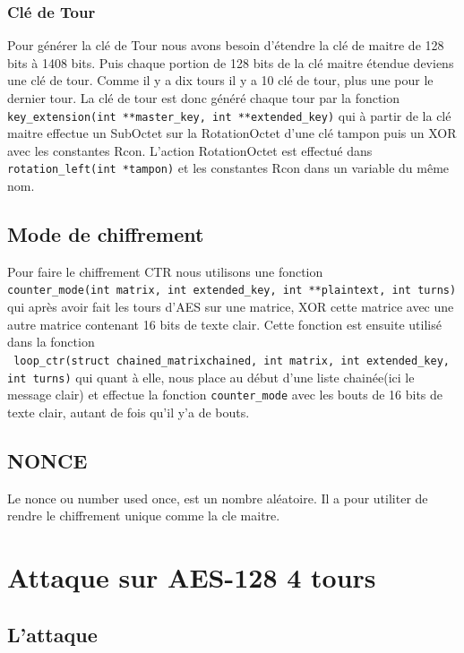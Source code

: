 \documentclass[10pt, a4paper]{report}
\begin{document}
	\subsection{Clé de Tour}
	Pour générer la clé de Tour nous avons besoin d'étendre la clé de maitre de 128 bits à 1408 bits. Puis chaque portion de 128 bits de la clé maitre étendue deviens une clé de tour. Comme il y a dix tours il y a 10 clé de tour, plus une pour le dernier tour. La clé de tour est donc généré chaque tour par la fonction \verb|key_extension(int **master_key, int **extended_key)| qui à partir de la clé maitre effectue un SubOctet sur la RotationOctet d'une clé tampon puis un XOR avec les constantes Rcon. L'action RotationOctet est effectué dans \verb|rotation_left(int *tampon)| et les constantes Rcon dans un variable du même nom.
	
	\section{Mode de chiffrement}
	Pour faire le chiffrement CTR nous utilisons une fonction\\ \verb|counter_mode(int matrix, int extended_key, int **plaintext, int turns)| qui après avoir fait les tours d'AES sur une matrice, XOR cette matrice avec une autre matrice contenant 16 bits de texte clair. Cette fonction est ensuite utilisé dans la fonction \\
	\verb| loop_ctr(struct chained_matrixchained, int matrix, int extended_key,| \verb|int turns)| qui quant à elle, nous place au début d'une liste chainée(ici le message clair) et effectue la fonction \verb|counter_mode| avec les bouts de 16 bits de texte clair, autant de fois qu'il y'a de bouts.
	
	\section{NONCE}
	Le nonce ou number used once, est un nombre aléatoire. Il a pour utiliter de rendre le chiffrement unique comme la cle maitre. 
	
	\chapter{Attaque sur AES-128 4 tours}
	\section{L'attaque}
	
\end{document}

